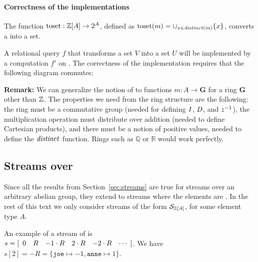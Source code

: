 \paragraph{Correctness of the \dbsp implementations}

The function $\mbox{toset}: \mathbb{Z}[A] \to 2^A$, defined as $\mbox{toset}(m) =
\cup_{x \in \mathit{distinct}(m)} \{ x \}$, converts a \zr into a set.

A relational query $f$ that transforms
a set $V$ into a set $U$ will be implemented by a \dbsp computation $f'$ on 
\zrs.  The correctness of the implementation requires that the following
diagram commutes:

\begin{center}
\end{center}

\textbf{Remark:} We can generalize the notion of \zrs to functions $m: A \to \mathbf{G}$ for a
ring $\mathbf{G}$ other than $\mathbb{Z}$.  The properties we need from the ring structure are the
following: the ring must be a commutative group (needed for defining $\mathit{I}$, $\mathit{D}$, and $z^{-1}$),
the multiplication operation must distribute over addition (needed to define 
Cartesian products), and there must be a notion of positive values, needed
to define the $\mathit{distinct}$ function.  Rings such as $\mathbb{Q}$ or $\mathbb{R}$
would work perfectly.

\subsection{Streams over \zrs}

Since all the results from Section~\ref{sec:streams} are true for streams
over an arbitrary abelian group, they extend to streams where the elements 
are \zrs.  In the rest of this text we only consider streams of the form $\mathcal{S}_{\mathbb{Z}[A]}$, for
some element type $A$.

An example of a stream of \zrs is \\ $s = \sv{0 R -1\cdot{R} 2\cdot{R} -2\cdot{R}}$.
We have $s[2] = -R = \{ \texttt{joe} \mapsto -1, \texttt{anne} \mapsto 1 \}$.

